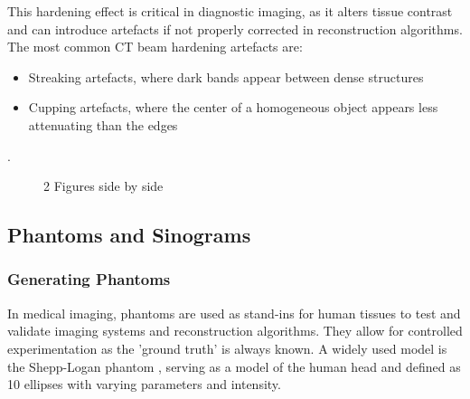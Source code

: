 \documentclass{article}
\theoremstyle{definition}
\begin{document}
This hardening effect is critical in diagnostic imaging, as it alters tissue contrast and can introduce artefacts if not properly corrected in reconstruction algorithms. The most common CT beam hardening artefacts are:
\begin{itemize}
	\item Streaking artefacts, where dark bands appear between dense structures
	\item Cupping artefacts, where the center of a homogeneous object appears less attenuating than the edges
\end{itemize}
\cite{Murphy2016}.
\begin{figure}%
    \centering
    \qquad
    \caption{2 Figures side by side}%
    \label{fig:example}%
\end{figure}

\subsection{Phantoms and Sinograms}
\subsubsection{Generating Phantoms}
In medical imaging, phantoms are used as stand-ins for human tissues to test and validate imaging systems and reconstruction algorithms. They allow for controlled experimentation as the 'ground truth' is always known. A widely used model is the Shepp-Logan phantom \cite{Shepp1974}, serving as a model of the human head and defined as 10 ellipses with varying parameters and intensity.
\end{document}
